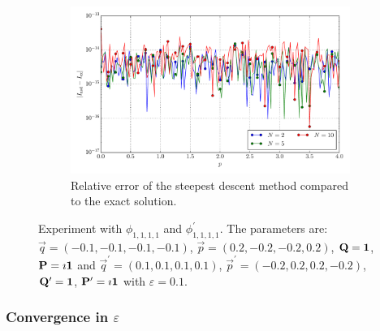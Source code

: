\documentclass[a4paper,10pt]{article}
\begin{document}
\begin{figure}[ht!]
\begin{subfigure}[t]{0.5\linewidth}
    \includegraphics[width=\linewidth]{./plots/tp_4d_conv_p_(1,1,1,1)_(1,1,1,1)_err_rel_nsd.pdf}
    \caption{Relative error of the steepest descent method compared to the exact solution.}
    \label{fig:tp_4d_conv_p_1111_1111_err_rel_nsd}
  \end{subfigure}
  \label{fig:tp_4d_conv_p_1111_1111}
  \caption{Experiment with $\phi_{1,1,1,1}$ and $\phi_{1,1,1,1}^{\prime}$.
  The parameters are:
  $\vec{q} = (-0.1, -0.1, -0.1, -0.1)$,
  $\vec{p} = ( 0.2, -0.2, -0.2,  0.2)$,
  $\mathbf{Q} = \mathbf{1}$,
  $\mathbf{P} = \imath \mathbf{1}$
  and
  $\vec{q}^\prime = ( 0.1, 0.1, 0.1,  0.1)$,
  $\vec{p}^\prime = (-0.2, 0.2, 0.2, -0.2)$,
  $\mathbf{Q}^\prime = \mathbf{1}$,
  $\mathbf{P}^\prime = \imath \mathbf{1}$
  with $\varepsilon=0.1$.}
\end{figure}


\FloatBarrier
\subsubsection{Convergence in $\varepsilon$}
\end{document}
